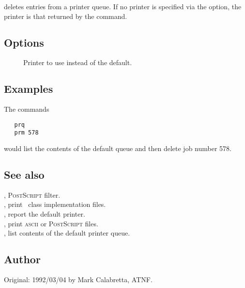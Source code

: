  deletes entries from a printer queue.  If no printer is specified
via the  option, the printer is that returned by the 
command.

\subsection*{Options}

\begin{description}
\item[]
   Printer to use instead of the default.
\end{description}

\subsection*{Examples}

The commands

\begin{verbatim}
   prq
   prm 578
\end{verbatim}

\noindent
would list the contents of the default queue and then delete job number 578.

\subsection*{See also}

, \textsc{PostScript} filter.\\
, print \aipspp\ class implementation files.\\
, report the default printer.\\
, print \textsc{ascii} or \textsc{PostScript} files.\\
, list contents of the default printer queue.

\subsection*{Author}

Original: 1992/03/04 by Mark Calabretta, ATNF.


\newpage
\section{}
\label{prq}

